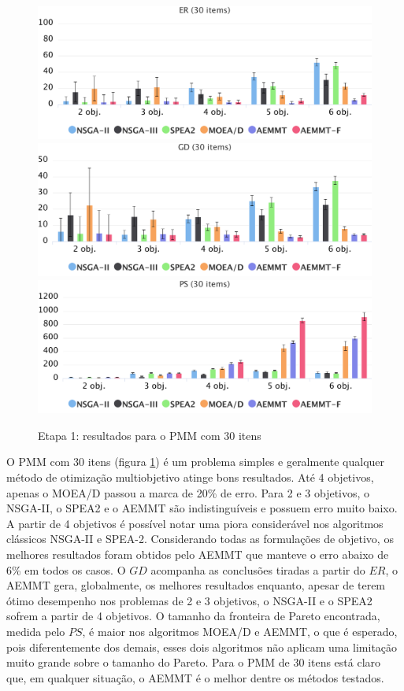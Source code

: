 \begin{figure}[!htbp]
	\caption{Etapa 1: resultados para o PMM com 30 itens}
	\label{fig_exp1_pmm_30}
	\includegraphics[width=1\textwidth]{cap_experimentos/figs/etapa1/er-mkp-30}
	\includegraphics[width=1\textwidth]{cap_experimentos/figs/etapa1/gd-mkp-30}
	\includegraphics[width=1\textwidth]{cap_experimentos/figs/etapa1/ps-mkp-30}
\end{figure}

O PMM com 30 itens (figura \ref{fig_exp1_pmm_30}) é um problema simples e geralmente qualquer método de otimização multiobjetivo atinge bons resultados. Até 4 objetivos, apenas o MOEA/D passou a marca de 20\% de erro. Para 2 e 3 objetivos, o NSGA-II, o SPEA2 e o AEMMT são indistinguíveis e possuem erro muito baixo. A partir de 4 objetivos é possível notar uma piora considerável nos algoritmos clássicos NSGA-II e SPEA-2. Considerando todas as formulações de objetivo, os melhores resultados foram obtidos pelo AEMMT que manteve o erro abaixo de 6\% em todos os casos. O $GD$ acompanha as conclusões tiradas a partir do $ER$, o AEMMT gera, globalmente, os melhores resultados enquanto, apesar de terem ótimo desempenho nos problemas de 2 e 3 objetivos, o NSGA-II e o SPEA2 sofrem a partir de 4 objetivos. O tamanho da fronteira de Pareto encontrada, medida pelo $PS$, é maior nos algoritmos MOEA/D e AEMMT, o que é esperado, pois diferentemente dos demais, esses dois algoritmos não aplicam uma limitação muito grande sobre o tamanho do Pareto. Para o PMM de 30 itens está claro que, em qualquer situação, o AEMMT é o melhor dentre os métodos testados.

